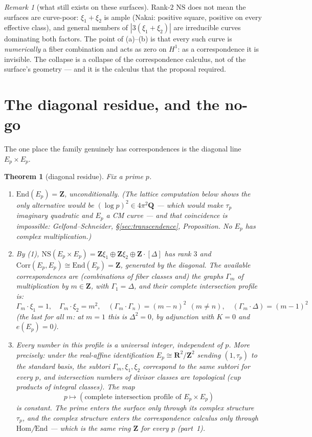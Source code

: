 \documentclass[11pt]{article}
\newtheorem{theorem}{Theorem}
\theoremstyle{definition}
\theoremstyle{remark}
\newtheorem{remark}{Remark}
\newcommand{\Z}{\mathbf{Z}}
\newcommand{\Q}{\mathbf{Q}}
\newcommand{\R}{\mathbf{R}}
\newcommand{\NS}{\mathrm{NS}}
\newcommand{\Hom}{\mathrm{Hom}}
\newcommand{\End}{\mathrm{End}}
\newcommand{\Corr}{\mathrm{Corr}}
\begin{document}
\begin{remark}[what still exists on these surfaces]
\label{rem:stillexists}
Rank-$2$ $\NS$ does not mean the surfaces are curve-poor: $\xi_1 + \xi_2$ is
ample (Nakai: positive square, positive on every effective class), and
general members of $|3(\xi_1+\xi_2)|$ are irreducible curves dominating both
factors. The point of (a)--(b) is that every such curve is \emph{numerically}
a fiber combination and acts as zero on $H^1$: as a correspondence it is
invisible. The collapse is a collapse of the correspondence calculus, not of
the surface's geometry --- and it is the calculus that the proposal required.
\end{remark}

\section{The diagonal residue, and the no-go}
\label{sec:diagonal}

The one place the family genuinely has correspondences is the diagonal line
$E_p \times E_p$.

\begin{theorem}[diagonal residue]
\label{thm:diagonal}
Fix a prime $p$.
\begin{enumerate}
\item $\End(E_p) = \Z$, unconditionally. (The lattice computation
below shows the only alternative would be $(\log p)^2 \in 4\pi^2\Q$ ---
which would make $\tau_p$ imaginary quadratic and $E_p$ a CM curve --- and
that coincidence is impossible: Gelfond--Schneider,
\S\ref{sec:transcendence}, Proposition. No $E_p$ has complex
multiplication.)
\item By (1), $\NS(E_p \times E_p) = \Z\xi_1 \oplus \Z\xi_2 \oplus \Z\cdot[\Delta]$
has rank $3$ and $\Corr(E_p, E_p) \cong \End(E_p) = \Z$, generated by the
diagonal. The available correspondences are (combinations of fiber classes
and) the graphs $\Gamma_m$ of multiplication by $m \in \Z$, with
$\Gamma_1 = \Delta$, and their complete intersection profile is:
\[
\Gamma_m\cdot\xi_1 = 1 , \quad
\Gamma_m\cdot\xi_2 = m^2 , \quad
(\Gamma_m\cdot\Gamma_n) = (m-n)^2 \ \ (m \neq n) , \quad
(\Gamma_m\cdot\Delta) = (m-1)^2
\]
(the last for all $m$: at $m = 1$ this is $\Delta^2 = 0$, by adjunction with
$K = 0$ and $e(E_p) = 0$).
\item Every number in this profile is a universal integer,
independent of $p$. More precisely: under the real-affine identification
$E_p \cong \R^2/\Z^2$ sending $(1, \tau_p)$ to the standard basis, the
subtori $\Gamma_m, \xi_1, \xi_2$ correspond to the \emph{same} subtori for
every $p$, and intersection numbers of divisor classes are topological (cup
products of integral classes). The map
\[
p \mapsto (\text{complete intersection profile of } E_p \times E_p)
\]
is constant. The prime enters the surface only through its complex structure
$\tau_p$, and the complex structure enters the correspondence calculus only
through $\Hom$/$\End$ --- which is the same ring $\Z$ for every $p$
(part~1).
\end{enumerate}
\end{theorem}
\end{document}

